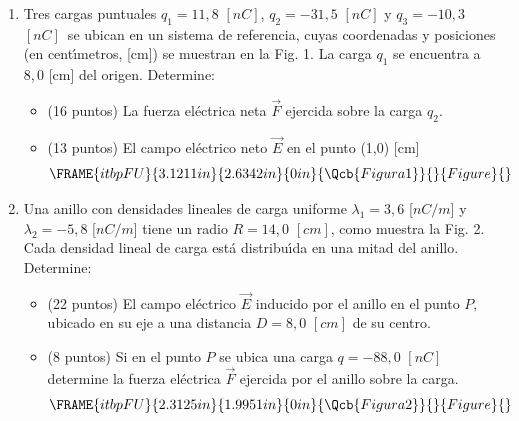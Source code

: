 \documentclass{article}
\begin{document}
\begin{enumerate}
\item Tres cargas puntuales $q_{1}=11,8$ $[nC]$, $q_{2}=-31,5$ $[nC]$ y $%
q_{3}=-10,3$ $[nC]$\ se ubican en un sistema de referencia, cuyas
coordenadas y posiciones (en cent\'{\i}metros, [cm]) se muestran en la Fig.
1. La carga $q_{1}$ se encuentra a $8,0$ [cm] del origen. Determine:

\begin{itemize}
\item (16 puntos) La fuerza el\'{e}ctrica neta $\vec{F}$ ejercida sobre la
carga $q_{2}.$

\item (13 puntos) El campo el\'{e}ctrico neto $\vec{E}$ en el punto (1,0)
[cm]%
\begin{equation*}
\FRAME{itbpFU}{3.1211in}{2.6342in}{0in}{\Qcb{Figura 1}}{}{Figure}{\special%
{language "Scientific Word";type "GRAPHIC";maintain-aspect-ratio
TRUE;display "USEDEF";valid_file "T";width 3.1211in;height 2.6342in;depth
0in;original-width 8.6957in;original-height 7.3293in;cropleft "0";croptop
"1";cropright "1";cropbottom "0";tempfilename
'S2Q8HD00.bmp';tempfile-properties "XPR";}}
\end{equation*}%
\pagebreak 
\end{itemize}

\item Una anillo con densidades lineales de carga uniforme $\lambda _{1}=3,6$
[$nC/m$] y $\lambda _{2}=-5,8$ [$nC/m$] tiene un radio $R=14,0$ $[cm]$, como
muestra la Fig. 2. Cada densidad lineal de carga est\'{a} distribu\'{\i}da
en una mitad del anillo. Determine:

\begin{itemize}
\item (22 puntos) El campo el\'{e}ctrico $\vec{E}$ inducido por el anillo en
el punto $P,$ ubicado en su eje a una distancia $D=8,0$ $[cm]$ de su centro.

\item (8 puntos) Si en el punto $P$ se ubica una carga $q=-88,0$ $[nC]$
determine la fuerza el\'{e}ctrica $\vec{F}$ ejercida por el anillo sobre la
carga. 
\begin{equation*}
\FRAME{itbpFU}{2.3125in}{1.9951in}{0in}{\Qcb{Figura 2}}{}{Figure}{\special%
{language "Scientific Word";type "GRAPHIC";maintain-aspect-ratio
TRUE;display "USEDEF";valid_file "T";width 2.3125in;height 1.9951in;depth
0in;original-width 7.1468in;original-height 6.1592in;cropleft "0";croptop
"1";cropright "1";cropbottom "0";tempfilename
'S2OMQG01.bmp';tempfile-properties "XPR";}}
\end{equation*}
\end{itemize}
\end{enumerate}
\end{document}
